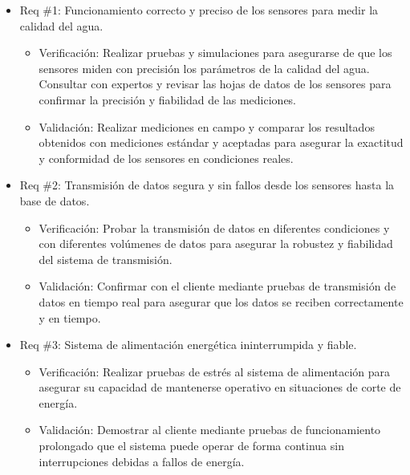 \begin{itemize} 
\item Req \#1: Funcionamiento correcto y preciso de los sensores para medir la calidad del agua.

\begin{itemize}
	\item Verificación: Realizar pruebas y simulaciones para asegurarse de que los sensores miden con precisión los parámetros de la calidad del agua. Consultar con expertos y revisar las hojas de datos de los sensores para confirmar la precisión y fiabilidad de las mediciones.
	\item Validación: Realizar mediciones en campo y comparar los resultados obtenidos con mediciones estándar y aceptadas para asegurar la exactitud y conformidad de los sensores en condiciones reales.
\end{itemize}

\item Req \#2: Transmisión de datos segura y sin fallos desde los sensores hasta la base de datos.

\begin{itemize}
	\item Verificación: Probar la transmisión de datos en diferentes condiciones y con diferentes volúmenes de datos para asegurar la robustez y fiabilidad del sistema de transmisión.
	\item Validación: Confirmar con el cliente mediante pruebas de transmisión de datos en tiempo real para asegurar que los datos se reciben correctamente y en tiempo.
\end{itemize}

\item Req \#3: Sistema de alimentación energética ininterrumpida y fiable.

\begin{itemize}
	\item Verificación: Realizar pruebas de estrés al sistema de alimentación para asegurar su capacidad de mantenerse operativo en situaciones de corte de energía.
	\item Validación: Demostrar al cliente mediante pruebas de funcionamiento prolongado que el sistema puede operar de forma continua sin interrupciones debidas a fallos de energía.
\end{itemize}



\end{itemize}

